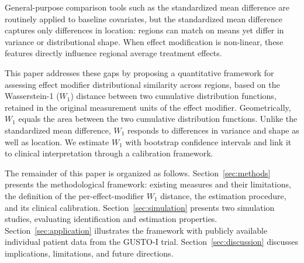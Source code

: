 \documentclass[AMA,Times1COL]{WileyNJDv5}
\begin{document}
General-purpose comparison tools such as the standardized mean difference are routinely applied to baseline covariates,\cite{austin2011} but the standardized mean difference captures only differences in location: regions can match on means yet differ in variance or distributional shape. When effect modification is non-linear, these features directly influence regional average treatment effects.

This paper addresses these gaps by proposing a quantitative framework for assessing effect modifier distributional similarity across regions, based on the Wasserstein-1 ($W_1$) distance between two cumulative distribution functions, retained in the original measurement units of the effect modifier. Geometrically, $W_1$ equals the area between the two cumulative distribution functions. Unlike the standardized mean difference, $W_1$ responds to differences in variance and shape as well as location. We estimate $W_1$ with bootstrap confidence intervals and link it to clinical interpretation through a calibration framework.

The remainder of this paper is organized as follows. Section~\ref{sec:methods} presents the methodological framework: existing measures and their limitations, the definition of the per-effect-modifier $W_1$ distance, the estimation procedure, and its clinical calibration. Section~\ref{sec:simulation} presents two simulation studies, evaluating identification and estimation properties. Section~\ref{sec:application} illustrates the framework with publicly available individual patient data from the GUSTO-I trial. Section~\ref{sec:discussion} discusses implications, limitations, and future directions.
\end{document}
